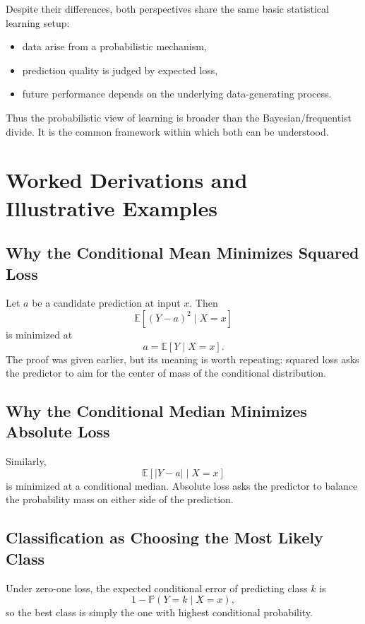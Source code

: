 Despite their differences, both perspectives share the same basic statistical learning setup:
\begin{itemize}
    \item data arise from a probabilistic mechanism,
    \item prediction quality is judged by expected loss,
    \item future performance depends on the underlying data-generating process.
\end{itemize}

Thus the probabilistic view of learning is broader than the Bayesian/frequentist divide. It is the common framework within which both can be understood.

\section{Worked Derivations and Illustrative Examples}

\subsection{Why the Conditional Mean Minimizes Squared Loss}

Let $a$ be a candidate prediction at input $x$. Then
\[
\mathbb{E}[(Y-a)^2\mid X=x]
\]
is minimized at
\[
a=\mathbb{E}[Y\mid X=x].
\]
The proof was given earlier, but its meaning is worth repeating: squared loss asks the predictor to aim for the center of mass of the conditional distribution.

\subsection{Why the Conditional Median Minimizes Absolute Loss}

Similarly,
\[
\mathbb{E}[|Y-a|\mid X=x]
\]
is minimized at a conditional median. Absolute loss asks the predictor to balance the probability mass on either side of the prediction.

\subsection{Classification as Choosing the Most Likely Class}

Under zero-one loss, the expected conditional error of predicting class $k$ is
\[
1-\mathbb{P}(Y=k\mid X=x),
\]
so the best class is simply the one with highest conditional probability.

